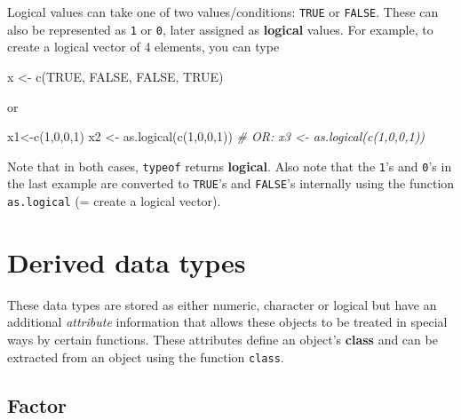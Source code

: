 \documentclass[
]{article}
\newenvironment{Shaded}{\begin{snugshade}}{\end{snugshade}}
\newcommand{\CommentTok}[1]{\textcolor[rgb]{0.56,0.35,0.01}{\textit{#1}}}
\newcommand{\ConstantTok}[1]{\textcolor[rgb]{0.00,0.00,0.00}{#1}}
\newcommand{\DecValTok}[1]{\textcolor[rgb]{0.00,0.00,0.81}{#1}}
\newcommand{\FunctionTok}[1]{\textcolor[rgb]{0.00,0.00,0.00}{#1}}
\newcommand{\NormalTok}[1]{#1}
\newcommand{\OtherTok}[1]{\textcolor[rgb]{0.56,0.35,0.01}{#1}}
\begin{document}
Logical values can take one of two values/conditions: \texttt{TRUE} or
\texttt{FALSE}. These can also be represented as \texttt{1} or
\texttt{0}, later assigned as \textbf{logical} values. For example, to
create a logical vector of 4 elements, you can type

\begin{Shaded}
\begin{Highlighting}[]
\NormalTok{x }\OtherTok{\textless{}{-}} \FunctionTok{c}\NormalTok{(}\ConstantTok{TRUE}\NormalTok{, }\ConstantTok{FALSE}\NormalTok{, }\ConstantTok{FALSE}\NormalTok{, }\ConstantTok{TRUE}\NormalTok{)}
\end{Highlighting}
\end{Shaded}

or

\begin{Shaded}
\begin{Highlighting}[]
\NormalTok{x1}\OtherTok{\textless{}{-}}\FunctionTok{c}\NormalTok{(}\DecValTok{1}\NormalTok{,}\DecValTok{0}\NormalTok{,}\DecValTok{0}\NormalTok{,}\DecValTok{1}\NormalTok{)}
\NormalTok{x2 }\OtherTok{\textless{}{-}} \FunctionTok{as.logical}\NormalTok{(}\FunctionTok{c}\NormalTok{(}\DecValTok{1}\NormalTok{,}\DecValTok{0}\NormalTok{,}\DecValTok{0}\NormalTok{,}\DecValTok{1}\NormalTok{))}
\CommentTok{\# OR: x3 \textless{}{-} as.logical(c(1,0,0,1))}
\end{Highlighting}
\end{Shaded}

Note that in both cases, \texttt{typeof} returns \textbf{logical}. Also
note that the \texttt{1}'s and \texttt{0}'s in the last example are
converted to \texttt{TRUE}'s and \texttt{FALSE}'s internally using the
function \texttt{as.logical} (= create a logical vector).

\hypertarget{derived-data-types}{%
\section{Derived data types}\label{derived-data-types}}

These data types are stored as either numeric, character or logical but
have an additional \emph{attribute} information that allows these
objects to be treated in special ways by certain functions. These
attributes define an object's \textbf{class} and can be extracted from
an object using the function \texttt{class}.

\hypertarget{factor}{%
\subsection{Factor}\label{factor}}
\end{document}
